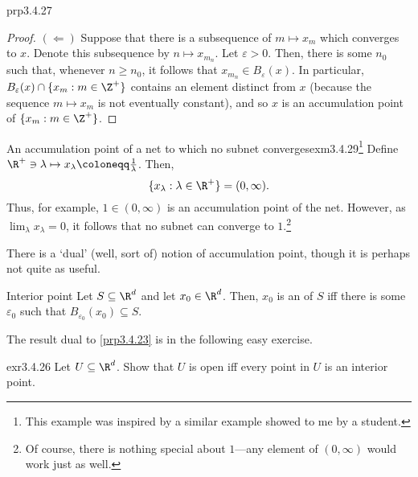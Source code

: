 \begin{prp}{}{prp3.4.27}
\begin{proof}
\blankline
\noindent
$(\Leftarrow )$ Suppose that there is a subsequence of $m\mapsto x_m$ which converges to $x$.  Denote this subsequence by $n\mapsto x_{m_n}$.  Let $\varepsilon >0$.  Then, there is some $n_0$ such that, whenever $n\geq n_0$, it follows that $x_{m_n}\in B_\varepsilon (x)$.  In particular, $B_\varepsilon (x)\cap \{ x_m:m\in \Z ^+\}$ contains an element distinct from $x$ (because the sequence $m\mapsto x_m$ is not eventually constant), and so $x$ is an accumulation point of $\{ x_m:m\in \Z ^+\}$.
\end{proof}
\end{prp}
\begin{exm}{An accumulation point of a net to which no subnet converges}{exm3.4.29}\footnote{This example was inspired by a similar example showed to me by a student.}
Define $\R ^+\ni \lambda \mapsto x_\lambda \coloneqq \frac{1}{\lambda}$.  Then,
\begin{equation}
\{ x_\lambda :\lambda \in \R ^+\} =(0,\infty ).
\end{equation}
Thus, for example, $1\in (0,\infty )$ is an accumulation point of the net.  However, as $\lim _\lambda x_\lambda =0$, it follows that no subnet can converge to $1$.\footnote{Of course, there is nothing special about $1$---any element of $(0,\infty )$ would work just as well.}
\end{exm}

There is a `dual' (well, sort of) notion of accumulation point, though it is perhaps not quite as useful.
\begin{dfn}{Interior point}{}
Let $S\subseteq \R ^d$ and let $x_0\in \R ^d$.  Then, $x_0$ is an  of $S$ iff there is some $\varepsilon _0$ such that $B_{\varepsilon _0}(x_0)\subseteq S$.
\end{dfn}
The result dual to \cref{prp3.4.23} is in the following easy exercise.
\begin{exr}{}{exr3.4.26}
Let $U\subseteq \R ^d$.  Show that $U$ is open iff every point in $U$ is an interior point.
\end{exr}

